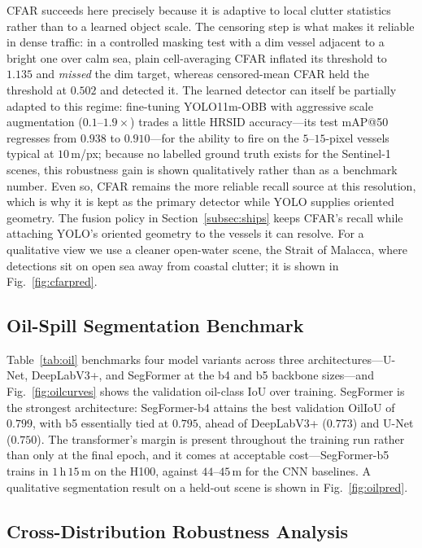 \documentclass{ieeeaccess}
\begin{document}
CFAR succeeds here precisely because it is adaptive to local clutter statistics rather than to a learned object scale. The censoring step is what makes it reliable in dense traffic: in a controlled masking test with a dim vessel adjacent to a bright one over calm sea, plain cell-averaging CFAR inflated its threshold to $1.135$ and \emph{missed} the dim target, whereas censored-mean CFAR held the threshold at $0.502$ and detected it. The learned detector can itself be partially adapted to this regime: fine-tuning YOLO11m-OBB with aggressive scale augmentation ($0.1$--$1.9\times$) trades a little HRSID accuracy---its test mAP@50 regresses from $0.938$ to $0.910$---for the ability to fire on the $5$--$15$-pixel vessels typical at $10$\,m/px; because no labelled ground truth exists for the Sentinel-1 scenes, this robustness gain is shown qualitatively rather than as a benchmark number. Even so, CFAR remains the more reliable recall source at this resolution, which is why it is kept as the primary detector while YOLO supplies oriented geometry. The fusion policy in Section~\ref{subsec:ships} keeps CFAR's recall while attaching YOLO's oriented geometry to the vessels it can resolve. For a qualitative view we use a cleaner open-water scene, the Strait of Malacca, where detections sit on open sea away from coastal clutter; it is shown in Fig.~\ref{fig:cfarpred}.

\subsection{Oil-Spill Segmentation Benchmark}

Table~\ref{tab:oil} benchmarks four model variants across three architectures---U-Net, DeepLabV3+, and SegFormer at the b4 and b5 backbone sizes---and Fig.~\ref{fig:oilcurves} shows the validation oil-class IoU over training. SegFormer is the strongest architecture: SegFormer-b4 attains the best validation OilIoU of $0.799$, with b5 essentially tied at $0.795$, ahead of DeepLabV3+ ($0.773$) and U-Net ($0.750$). The transformer's margin is present throughout the training run rather than only at the final epoch, and it comes at acceptable cost---SegFormer-b5 trains in $1$\,h\,$15$\,m on the H100, against $44$--$45$\,m for the CNN baselines. A qualitative segmentation result on a held-out scene is shown in Fig.~\ref{fig:oilpred}.

\subsection{Cross-Distribution Robustness Analysis}
\label{subsec:robust}
\end{document}
